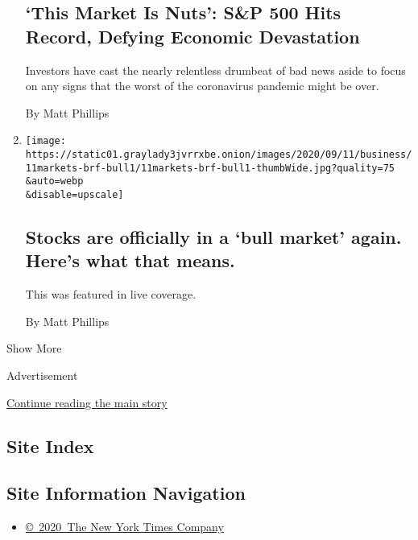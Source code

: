 \begin{enumerate}
  \hypertarget{this-market-is-nuts-sp-500-hits-record-defying-economic-devastation}{%
  \subsection{`This Market Is Nuts': S\&P 500 Hits Record, Defying
  Economic
  Devastation}\label{this-market-is-nuts-sp-500-hits-record-defying-economic-devastation}}

  Investors have cast the nearly relentless drumbeat of bad news aside
  to focus on any signs that the worst of the coronavirus pandemic might
  be over.

  By Matt Phillips
\item
  \href{/live/2020/08/18/business/stock-market-today-coronavirus/stocks-are-officially-in-a-bull-market-again-heres-what-that-means}{}

  \texttt{[image: https://static01.graylady3jvrrxbe.onion/images/2020/09/11/business/11markets-brf-bull1/11markets-brf-bull1-thumbWide.jpg?quality=75\\\&auto=webp\\\&disable=upscale]}

  \hypertarget{stocks-are-officially-in-a-bull-market-again-heres-what-that-means}{%
  \subsection{Stocks are officially in a `bull market' again. Here's
  what that
  means.}\label{stocks-are-officially-in-a-bull-market-again-heres-what-that-means}}

  This was featured in live coverage.

  By Matt Phillips
\end{enumerate}

Show More

Advertisement

\protect\hyperlink{after-mid2}{Continue reading the main story}

\hypertarget{site-index}{%
\subsection{Site Index}\label{site-index}}

\hypertarget{site-information-navigation}{%
\subsection{Site Information
Navigation}\label{site-information-navigation}}

\begin{itemize}
\tightlist
\item
  \href{https://help.nytimes3xbfgragh.onion/hc/en-us/articles/115014792127-Copyright-notice}{©~2020~The
  New York Times Company}
\end{itemize}

